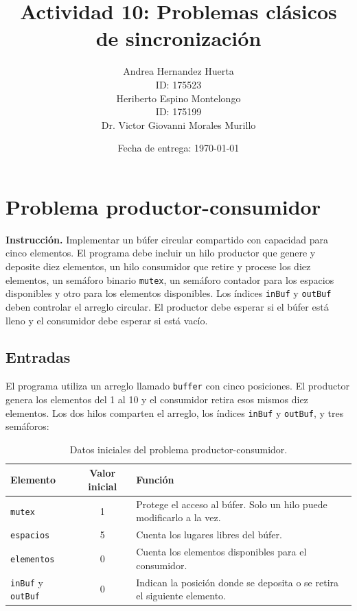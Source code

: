 \documentclass[12pt,oneside]{template/liverpoolthesis}
\title{Actividad 10: Problemas clásicos de sincronización}
\author{%
  Andrea Hernandez Huerta\\
  ID: 175523\\[1em]
  Heriberto Espino Montelongo\\
  ID: 175199\\[1em]
  \text{Profesor:} Dr. Victor Giovanni Morales Murillo}
\date{Fecha de entrega: \today}
\begin{document}
\frontmatter
\maketitle
\tableofcontents
\listoffigures
\listoftables

\mainmatter

\chapter{Problema productor-consumidor}

\textbf{Instrucción.} Implementar un búfer circular compartido con capacidad
para cinco elementos. El programa debe incluir un hilo productor que genere y
deposite diez elementos, un hilo consumidor que retire y procese los diez
elementos, un semáforo binario \texttt{mutex}, un semáforo contador para los
espacios disponibles y otro para los elementos disponibles. Los índices
\texttt{inBuf} y \texttt{outBuf} deben controlar el arreglo circular. El
productor debe esperar si el búfer está lleno y el consumidor debe esperar si
está vacío.

\section{Entradas}

El programa utiliza un arreglo llamado \texttt{buffer} con cinco posiciones.
El productor genera los elementos del 1 al 10 y el consumidor retira esos
mismos diez elementos. Los dos hilos comparten el arreglo, los índices
\texttt{inBuf} y \texttt{outBuf}, y tres semáforos:

\begin{table}[H]
\centering
\caption{Datos iniciales del problema productor-consumidor.}
\label{tab:entradas-productor-consumidor}
\begin{tabularx}{\textwidth}{P{4.0cm} c L}
\toprule
\textbf{Elemento} & \textbf{Valor inicial} & \textbf{Función}\\
\midrule
\texttt{mutex} & 1 & Protege el acceso al búfer. Solo un hilo puede modificarlo a la vez.\\
\texttt{espacios} & 5 & Cuenta los lugares libres del búfer.\\
\texttt{elementos} & 0 & Cuenta los elementos disponibles para el consumidor.\\
\texttt{inBuf} y \texttt{outBuf} & 0 & Indican la posición donde se deposita o se retira el siguiente elemento.\\
\bottomrule
\end{tabularx}
\end{table}
\end{document}
